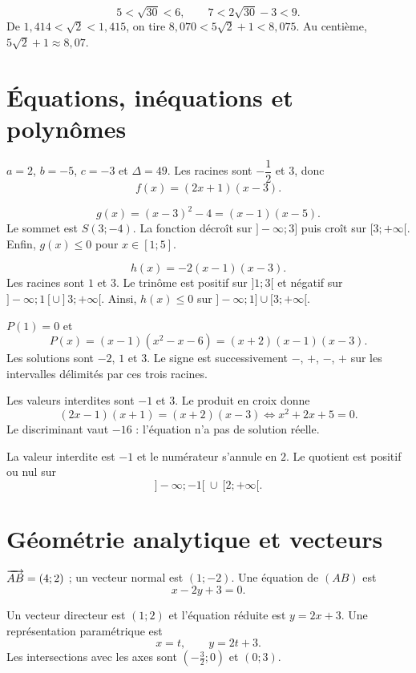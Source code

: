 \[
5<\sqrt{30}<6,\qquad 7<2\sqrt{30}-3<9.
\]
De $1{,}414<\sqrt2<1{,}415$, on tire
$8{,}070<5\sqrt2+1<8{,}075$. Au centième,
$5\sqrt2+1\approx8{,}07$.

\section*{Équations, inéquations et polynômes}

$a=2$, $b=-5$, $c=-3$ et $\Delta=49$. Les racines sont
$-\dfrac12$ et $3$, donc
\[
 f(x)=(2x+1)(x-3).
\]

\[
 g(x)=(x-3)^2-4=(x-1)(x-5).
\]
Le sommet est $S(3;-4)$. La fonction décroît sur $]-\infty;3]$ puis croît
sur $[3;+\infty[$. Enfin, $g(x)\leq0$ pour $x\in[1;5]$.

\[
 h(x)=-2(x-1)(x-3).
\]
Les racines sont $1$ et $3$. Le trinôme est positif sur $]1;3[$ et négatif
sur $]-\infty;1[\cup]3;+\infty[$. Ainsi,
$h(x)\leq0$ sur $]-\infty;1]\cup[3;+\infty[$.

$P(1)=0$ et
\[
 P(x)=(x-1)(x^2-x-6)=(x+2)(x-1)(x-3).
\]
Les solutions sont $-2$, $1$ et $3$. Le signe est successivement
$-$, $+$, $-$, $+$ sur les intervalles délimités par ces trois racines.

Les valeurs interdites sont $-1$ et $3$. Le produit en croix donne
\[
(2x-1)(x+1)=(x+2)(x-3)
\iff x^2+2x+5=0.
\]
Le discriminant vaut $-16$ : l'équation n'a pas de solution réelle.

La valeur interdite est $-1$ et le numérateur s'annule en $2$.
Le quotient est positif ou nul sur
\[
 ]-\infty;-1[\ \cup\ [2;+\infty[.
\]

\section*{Géométrie analytique et vecteurs}

$\overrightarrow{AB}=(4;2)$ ; un vecteur normal est $(1;-2)$. Une équation de $(AB)$ est
\[
 x-2y+3=0.
\]

Un vecteur directeur est $(1;2)$ et l'équation réduite est $y=2x+3$.
Une représentation paramétrique est
\[
 x=t,\qquad y=2t+3.
\]
Les intersections avec les axes sont $\left(-\frac32;0\right)$ et $(0;3)$.


